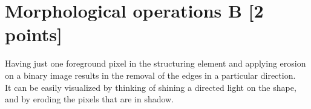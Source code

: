 \documentclass[tikz,14pt,fleqn]{article}
\begin{document}
\section{Morphological operations B [2 points]}
Having just one foreground pixel in the structuring element and applying erosion on a binary image results in the removal of the edges in a particular direction.\\
It can be easily visualized by thinking of shining a directed light on the shape, and by eroding the pixels that are in shadow.

\end{document}
